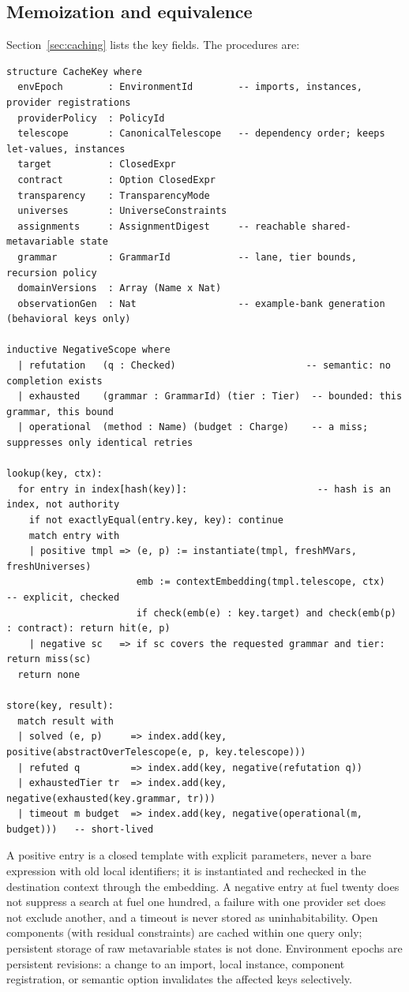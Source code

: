 \subsection{Memoization and equivalence}\label{alg:cache}

Section~\ref{sec:caching} lists the key fields. The procedures are:
\begin{lstlisting}
structure CacheKey where
  envEpoch        : EnvironmentId        -- imports, instances, provider registrations
  providerPolicy  : PolicyId
  telescope       : CanonicalTelescope   -- dependency order; keeps let-values, instances
  target          : ClosedExpr
  contract        : Option ClosedExpr
  transparency    : TransparencyMode
  universes       : UniverseConstraints
  assignments     : AssignmentDigest     -- reachable shared-metavariable state
  grammar         : GrammarId            -- lane, tier bounds, recursion policy
  domainVersions  : Array (Name x Nat)
  observationGen  : Nat                  -- example-bank generation (behavioral keys only)

inductive NegativeScope where
  | refutation   (q : Checked)                       -- semantic: no completion exists
  | exhausted    (grammar : GrammarId) (tier : Tier)  -- bounded: this grammar, this bound
  | operational  (method : Name) (budget : Charge)    -- a miss; suppresses only identical retries

lookup(key, ctx):
  for entry in index[hash(key)]:                       -- hash is an index, not authority
    if not exactlyEqual(entry.key, key): continue
    match entry with
    | positive tmpl => (e, p) := instantiate(tmpl, freshMVars, freshUniverses)
                       emb := contextEmbedding(tmpl.telescope, ctx)   -- explicit, checked
                       if check(emb(e) : key.target) and check(emb(p) : contract): return hit(e, p)
    | negative sc   => if sc covers the requested grammar and tier: return miss(sc)
  return none

store(key, result):
  match result with
  | solved (e, p)     => index.add(key, positive(abstractOverTelescope(e, p, key.telescope)))
  | refuted q         => index.add(key, negative(refutation q))
  | exhaustedTier tr  => index.add(key, negative(exhausted(key.grammar, tr)))
  | timeout m budget  => index.add(key, negative(operational(m, budget)))   -- short-lived
\end{lstlisting}
A positive entry is a closed template with explicit parameters, never a bare expression with old local identifiers; it is instantiated and rechecked in the destination context through the embedding. A negative entry at fuel twenty does not suppress a search at fuel one hundred, a failure with one provider set does not exclude another, and a timeout is never stored as uninhabitability. Open components (with residual constraints) are cached within one query only; persistent storage of raw metavariable states is not done. Environment epochs are persistent revisions: a change to an import, local instance, component registration, or semantic option invalidates the affected keys selectively.

